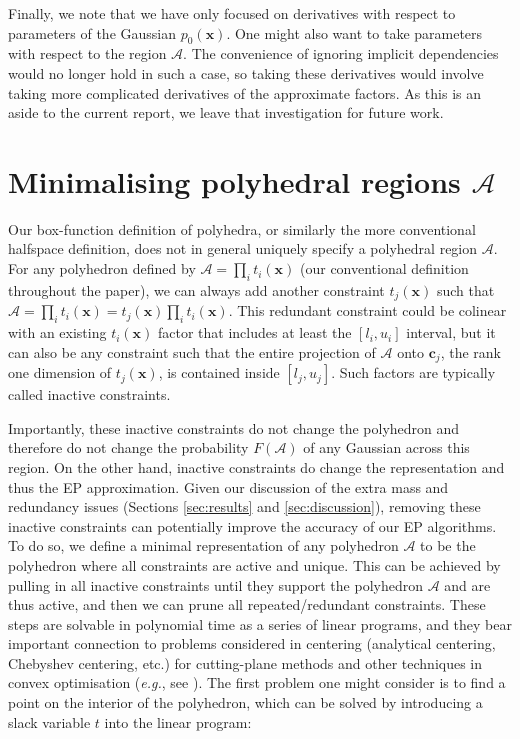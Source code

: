 \documentclass[twoside,11pt]{article}
\def\x{{\mathbf x}}
\def\c{{\mathbf c}}
\def\regionA{\mathcal{A}}
\begin{document}
Finally, we note that we have only focused on derivatives with respect to parameters of the Gaussian $p_0(\x)$.  One might also want to take parameters with respect to the region $\regionA$.  The convenience of ignoring implicit dependencies would no longer hold in such a case, so taking these derivatives would involve taking more complicated derivatives of the approximate factors.  As this is an aside to the current report, we leave that investigation for future work.




\newpage

\section{Minimalising polyhedral regions $\regionA$}
\label{sec:minpoly}

Our box-function definition of polyhedra, or similarly the more conventional halfspace definition, does not in general uniquely specify a polyhedral region $\regionA$.   For any polyhedron defined by $\regionA = \prod_i t_i(\x)$ (our conventional definition throughout the paper), we can always add another constraint $t_j(\x)$ such that $\regionA = \prod_i t_i(\x) = t_j(\x) \prod_i t_i(\x)$.   This redundant constraint could be colinear with an existing $t_i(\x)$ factor that includes at least the $[l_i,u_i]$ interval, but it can also be any constraint such that the entire projection of $\regionA$ onto $\c_j$, the rank one dimension of $t_j(\x)$, is contained inside $[l_j,u_j]$.  Such factors are typically called inactive constraints.  

Importantly, these inactive constraints do not change the polyhedron and therefore do not change the probability $F(\regionA)$ of any Gaussian across this region.  On the other hand, inactive constraints do change the representation and thus the EP approximation.  Given our discussion of the extra mass and redundancy issues (Sections \ref{sec:results} and \ref{sec:discussion}), removing these inactive constraints can potentially improve the accuracy of our EP algorithms.  To do so, we define a minimal representation of any polyhedron $\regionA$ to be the polyhedron where all constraints are active and unique.  This can be achieved by pulling in all inactive constraints until they support the polyhedron $\regionA$ and are thus active, and then we can prune all repeated/redundant constraints.  These steps are solvable in polynomial time as a series of linear programs, and they bear important connection to problems considered in centering (analytical centering, Chebyshev centering, etc.) for cutting-plane methods and other techniques in convex optimisation ({\it e.g.}, see \cite{boydBook}).    The first problem one might consider is to find a point on the interior of the polyhedron, which can be solved by introducing a slack variable $t$ into the linear program:  
\end{document}
